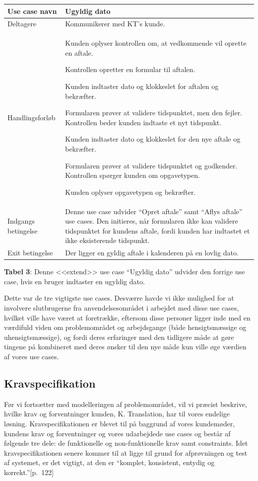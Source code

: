 \documentclass[12pt]{article}   %
\newcommand{\nextitem}{\par\hspace*{\labelsep}\textbullet\hspace*{\labelsep}}
\begin{document}
\hskip-1.0cm\begin{tabular}{l p{11cm}}
Use case navn & Ugyldig dato \\ \hline
Deltagere & \nextitem Kommunikerer med KT's kunde.
            \\ \hline
Handlingsforløb &
	\nextitem Kunden oplyser kontrollen om, at vedkommende vil oprette en
	aftale.
	\nextitem Kontrollen opretter en formular til aftalen.
	\nextitem Kunden indtaster dato og klokkeslet for aftalen og
	bekræfter.
	\nextitem Formularen prøver at validere tidspunktet, men den fejler.
	Kontrollen beder kunden indtaste et nyt tidspunkt.
	\nextitem Kunden indtaster dato og klokkeslet for den nye aftale og
	bekræfter.
	\nextitem Formularen prøver at validere tidspunktet og godkender.
	Kontrollen spørger kunden om opgavetypen.
	\nextitem Kunden oplyser opgavetypen og bekræfter.
	\\ \hline
	Indgangs betingelse &
		\nextitem Denne use case udvider ``Opret aftale'' samt ``Aflys
		aftale'' use cases. Den initieres, når formularen ikke kan
		validere tidspunktet for kundens aftale, fordi kunden har
		indtastet et ikke eksisterende tidspunkt.  
		\\ \hline
Exit betingelse & Der ligger en gyldig aftale i kalenderen på en lovlig dato.
	\\ \hline
\end{tabular}
\vspace{0.3cm}

\textbf{Tabel 3}: Denne <<extend>> use case ``Ugyldig dato'' udvider den forrige use \\ \indent case, hvis en bruger indtaster en ugyldig dato.        

\vspace{0.5cm}

Dette var de tre vigtigste use cases. Desværre havde vi ikke mulighed for at involvere slutbrugerne fra anvendelsesområdet i arbejdet med disse use cases, hvilket  ville have været at foretrække, eftersom disse personer ligger inde med en værdifuld viden om problemområdet og arbejdsgange (både hensigtsmæssige og uhensigtsmæssige), og fordi deres erfaringer med den tidligere måde at gøre tingene på kombineret med deres ønsker til den nye måde kun ville øge værdien af vores use cases.

\subsection{Kravspecifikation}

Før vi fortsætter med modelleringen af problemområdet, vil vi præcist beskrive, hvilke krav og forventninger kunden, K. Translation, har til vores endelige løsning. Kravspecifikationen er blevet til på baggrund af vores kundemøder, kundens krav og forventninger og vores udarbejdede use cases og består af følgende tre dele: de funktionelle og non-funktionelle krav samt constraints. Idet kravspecifikationen senere kommer til at ligge
til grund for afprøvningen og test af systemet, er det vigtigt, at den er ``komplet, konsistent, entydig og korrekt.''\cite{oose}[p.~122] \\
\end{document}
